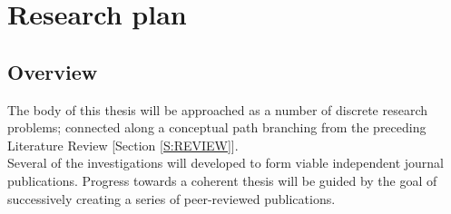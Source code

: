 \newpage
\section{Research plan}  
\label{S:work_plan} 


\subsection{Overview}

The body of this thesis will be approached as a number of discrete research problems; connected along a conceptual path branching from the preceding Literature Review [Section \ref{S:REVIEW}].\\
Several of the investigations will developed to form viable independent journal publications.  Progress towards a coherent thesis will be guided by the goal of successively creating a series of peer-reviewed publications.\\





